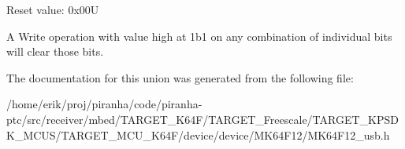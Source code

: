 Reset value\+: 0x00U

A Write operation with value high at 1\textquotesingle{}b1 on any combination of individual bits will clear those bits. 

The documentation for this union was generated from the following file\+:\begin{DoxyCompactItemize}
\item 
/home/erik/proj/piranha/code/piranha-\/ptc/src/receiver/mbed/\+T\+A\+R\+G\+E\+T\+\_\+\+K64\+F/\+T\+A\+R\+G\+E\+T\+\_\+\+Freescale/\+T\+A\+R\+G\+E\+T\+\_\+\+K\+P\+S\+D\+K\+\_\+\+M\+C\+U\+S/\+T\+A\+R\+G\+E\+T\+\_\+\+M\+C\+U\+\_\+\+K64\+F/device/device/\+M\+K64\+F12/M\+K64\+F12\+\_\+usb.\+h\end{DoxyCompactItemize}
